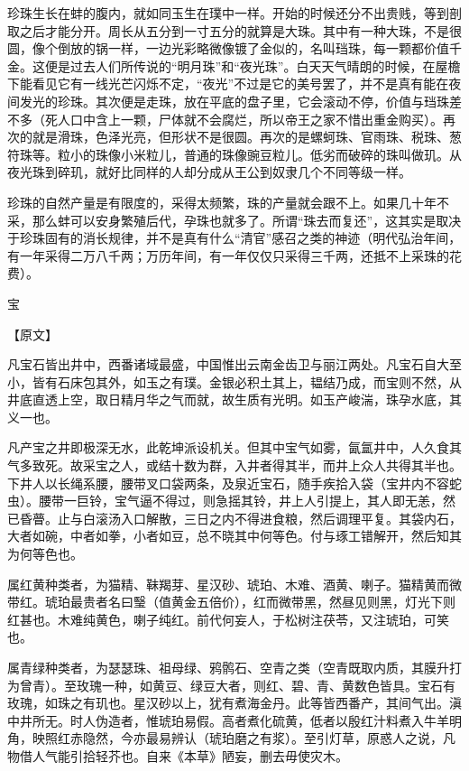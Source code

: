 \documentclass[12pt,UTF8]{ctexbook}
\begin{document}
珍珠生长在蚌的腹内，就如同玉生在璞中一样。开始的时候还分不出贵贱，等到剖取之后才能分开。周长从五分到一寸五分的就算是大珠。其中有一种大珠，不是很圆，像个倒放的锅一样，一边光彩略微像镀了金似的，名叫珰珠，每一颗都价值千金。这便是过去人们所传说的“明月珠”和“夜光珠”。白天天气晴朗的时候，在屋檐下能看见它有一线光芒闪烁不定，“夜光”不过是它的美号罢了，并不是真有能在夜间发光的珍珠。其次便是走珠，放在平底的盘子里，它会滚动不停，价值与珰珠差不多（死人口中含上一颗，尸体就不会腐烂，所以帝王之家不惜出重金购买）。再次的就是滑珠，色泽光亮，但形状不是很圆。再次的是螺蚵珠、官雨珠、税珠、葱符珠等。粒小的珠像小米粒儿，普通的珠像豌豆粒儿。低劣而破碎的珠叫做玑。从夜光珠到碎玑，就好比同样的人却分成从王公到奴隶几个不同等级一样。

珍珠的自然产量是有限度的，采得太频繁，珠的产量就会跟不上。如果几十年不采，那么蚌可以安身繁殖后代，孕珠也就多了。所谓“珠去而复还”，这其实是取决于珍珠固有的消长规律，并不是真有什么“清官”感召之类的神迹（明代弘治年间，有一年采得二万八千两；万历年间，有一年仅仅只采得三千两，还抵不上采珠的花费）。

宝

【原文】

凡宝石皆出井中，西番诸域最盛，中国惟出云南金齿卫与丽江两处。凡宝石自大至小，皆有石床包其外，如玉之有璞。金银必积土其上，韫结乃成，而宝则不然，从井底直透上空，取日精月华之气而就，故生质有光明。如玉产峻湍，珠孕水底，其义一也。

凡产宝之井即极深无水，此乾坤派设机关。但其中宝气如雾，氤氲井中，人久食其气多致死。故采宝之人，或结十数为群，入井者得其半，而井上众人共得其半也。下井人以长绳系腰，腰带叉口袋两条，及泉近宝石，随手疾拾入袋（宝井内不容蛇虫）。腰带一巨铃，宝气逼不得过，则急摇其铃，井上人引提上，其人即无恙，然已昏瞢。止与白滚汤入口解散，三日之内不得进食粮，然后调理平复。其袋内石，大者如碗，中者如拳，小者如豆，总不晓其中何等色。付与琢工错解开，然后知其为何等色也。

属红黄种类者，为猫精、靺羯芽、星汉砂、琥珀、木难、酒黄、喇子。猫精黄而微带红。琥珀最贵者名曰瑿（值黄金五倍价），红而微带黑，然昼见则黑，灯光下则红甚也。木难纯黄色，喇子纯红。前代何妄人，于松树注茯苓，又注琥珀，可笑也。

属青绿种类者，为瑟瑟珠、祖母绿、鸦鹘石、空青之类（空青既取内质，其膜升打为曾青）。至玫瑰一种，如黄豆、绿豆大者，则红、碧、青、黄数色皆具。宝石有玫瑰，如珠之有玑也。星汉砂以上，犹有煮海金丹。此等皆西番产，其间气出。滇中井所无。时人伪造者，惟琥珀易假。高者煮化硫黄，低者以殷红汁料煮入牛羊明角，映照红赤隐然，今亦最易辨认（琥珀磨之有浆）。至引灯草，原惑人之说，凡物借人气能引拾轻芥也。自来《本草》陋妄，删去毋使灾木。
\end{document}
